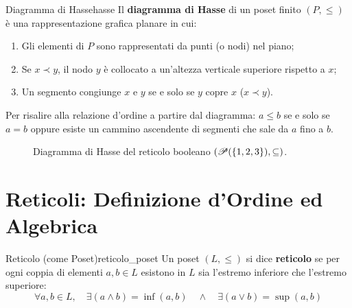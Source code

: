 \begin{definizione}{Diagramma di Hasse}{hasse}
Il \textbf{diagramma di Hasse} di un poset finito $(P, \le)$ è una rappresentazione grafica planare in cui:
\begin{enumerate}
    \item Gli elementi di $P$ sono rappresentati da punti (o nodi) nel piano;
    \item Se $x \prec y$, il nodo $y$ è collocato a un'altezza verticale superiore rispetto a $x$;
    \item Un segmento congiunge $x$ e $y$ se e solo se $y$ copre $x$ ($x \prec y$).
\end{enumerate}
\end{definizione}

Per risalire alla relazione d'ordine a partire dal diagramma: $a \le b$ se e solo se $a = b$ oppure esiste un cammino ascendente di segmenti che sale da $a$ fino a $b$.

\begin{figure}[htbp]
\centering
{}
\caption{Diagramma di Hasse del reticolo booleano $(\mathscr{P}(\{1,2,3\}), \subseteq)$.}
\label{fig:hasse_p3}
\end{figure}

\section{Reticoli: Definizione d'Ordine ed Algebrica}

\begin{definizione}{Reticolo (come Poset)}{reticolo_poset}
Un poset $(L, \le)$ si dice \textbf{reticolo} se per ogni coppia di elementi $a, b \in L$ esistono in $L$ sia l'estremo inferiore che l'estremo superiore:
\[
    \forall a, b \in L, \quad \exists (a \wedge b) = \inf(a, b) \quad \wedge \quad \exists (a \vee b) = \sup(a, b)
\]
\end{definizione}


